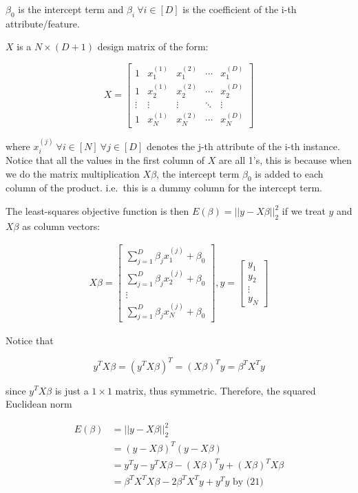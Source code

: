 \documentclass[12pt,a4paper]{article}
\begin{document}
\(\beta_0\) is the intercept term and \(\beta_i\ \forall i \in [D]\) is
the coefficient of the i-th attribute/feature.

\(X\) is a \(N \times (D+1)\) design matrix of the form:

\begin{equation}X=\begin{bmatrix}1&x_{1}^{(1)}&x_1^{(2)} &\cdots& x_1^{(D)}\\1&x_{2}^{(1)}&x_2^{(2)} &\cdots& x_2^{(D)}\\ \vdots & \vdots &\vdots &\ddots & \vdots\\ 1&x_{N}^{(1)}&x_N^{(2)} &\cdots& x_N^{(D)}\end{bmatrix}\end{equation}

where \(x_i^{(j)}\ \forall i \in [N] \ \forall j \in [D]\) denotes the
j-th attribute of the i-th instance. Notice that all the values in the
first column of \(X\) are all 1's, this is because when we do the matrix
multiplication \(X\beta\), the intercept term \(\beta_0\) is added to
each column of the product. i.e.~this is a dummy column for the
intercept term.

The least-squares objective function is then
\(E(\beta)=||y-X\beta||_2^2\) if we treat \(y\) and \(X\beta\) as column
vectors:

\begin{align}X\beta=\begin{bmatrix}\sum^D_{j=1}\beta_jx^{(j)}_1+\beta_0\\\sum^D_{j=1}\beta_jx^{(j)}_2+\beta_0\\\vdots\\\sum^D_{j=1}\beta_jx^{(j)}_N+\beta_0 \end{bmatrix},y=\begin{bmatrix}y_1\\ y_2\\\vdots\\y_N\end{bmatrix}\end{align}

Notice that

\begin{equation}y^TX\beta= (y^TX\beta)^T =(X\beta)^Ty=\beta^TX^Ty\end{equation}

since \(y^TX\beta\) is just a \(1 \times 1\) matrix, thus symmetric.
Therefore, the squared Euclidean norm

\begin{align}
E(\beta)&=||y-X\beta||_2^2\\&=(y-X\beta)^T(y-X\beta)\\&=y^Ty-y^TX\beta-(X\beta)^Ty+(X\beta)^TX\beta\\&=\beta^TX^TX\beta-2\beta^TX^Ty+y^Ty\text{ by (21)}
\end{align}
\end{document}

